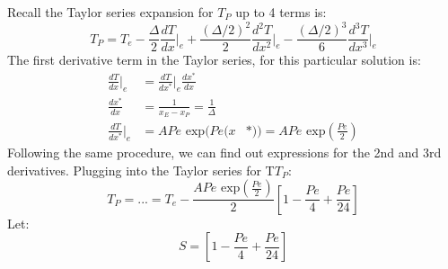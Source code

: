 \documentclass[11pt]{article}
\begin{document}
Recall the Taylor series expansion for \(T_P\) up to 4 terms is:
\begin{equation*}
T_P = T_e - \frac{\Delta}{2}\frac{dT}{dx}\biggr \rvert_e + \frac{(\Delta / 2)^2}{2}\frac{d^2T}{dx^2}\biggr \rvert_e -
\frac{(\Delta / 2)^3}{6}\frac{d^3T}{dx^3}\biggr \rvert_e 
\end{equation*}
The first derivative term in the Taylor series, for this particular solution is:
\begin{equation*}
\begin{aligned}
\frac{dT}{dx}\biggr\rvert_e &= \frac{dT}{dx^*}\biggr\rvert_e \frac{dx^*}{dx}\\
\frac{dx^*}{dx} &= \frac{1}{x_E-x_P} = \frac{1}{\Delta}\\
\frac{dT}{dx^*}\biggr \rvert_e &= APe\textrm{ exp}(Pe (x&*)) = APe\textrm{ exp}\left(\frac{Pe}{2}\right)
\end{aligned}
\end{equation*}
Following the same procedure, we can find out expressions for the 2nd and 3rd derivatives. Plugging into the Taylor series for T\(T_P\):
\begin{equation*}
T_P = ... = T_e - \frac{APe \textrm{ exp} \left(\frac{Pe}{2}\right)} {2} \left[1 - \frac{Pe}{4} + \frac{Pe}{24} \right]
\end{equation*}
Let:
\begin{equation*}
S = \left[1 - \frac{Pe}{4} + \frac{Pe}{24} \right]
\end{equation*}
\end{document}
